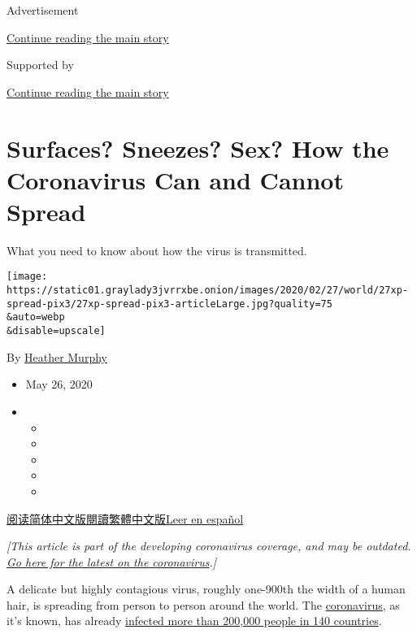 Advertisement

\protect\hyperlink{after-top}{Continue reading the main story}

Supported by

\protect\hyperlink{after-sponsor}{Continue reading the main story}

\hypertarget{surfaces-sneezes-sex-how-the-coronavirus-can-and-cannot-spread}{%
\section{Surfaces? Sneezes? Sex? How the Coronavirus Can and Cannot
Spread}\label{surfaces-sneezes-sex-how-the-coronavirus-can-and-cannot-spread}}

What you need to know about how the virus is transmitted.

\texttt{[image: https://static01.graylady3jvrrxbe.onion/images/2020/02/27/world/27xp-spread-pix3/27xp-spread-pix3-articleLarge.jpg?quality=75\\\&auto=webp\\\&disable=upscale]}

By \href{https://www.nytimes3xbfgragh.onion/by/heather-murphy}{Heather
Murphy}

\begin{itemize}
\item
  May 26, 2020
\item
  \begin{itemize}
  \item
  \item
  \item
  \item
  \item
  \end{itemize}
\end{itemize}

\href{https://cn.nytimes3xbfgragh.onion/health/20200303/coronavirus-how-it-spreads/}{阅读简体中文版}\href{https://cn.nytimes3xbfgragh.onion/health/20200303/coronavirus-how-it-spreads/zh-hant/}{閱讀繁體中文版}\href{https://www.nytimes3xbfgragh.onion/es/2020/03/03/espanol/ciencia-y-tecnologia/coronavirus-como-se-transmite.html}{Leer
en español}

\emph{{[}This article is part of the developing coronavirus coverage,
and may be outdated.}
\href{https://www.nytimes3xbfgragh.onion/news-event/coronavirus}{\emph{Go
here for the latest on the coronavirus}}\emph{.{]}}

A delicate but highly contagious virus, roughly one-900th the width of a
human hair, is spreading from person to person around the world. The
\href{https://www.nytimes3xbfgragh.onion/2020/03/03/world/coronavirus-news.html}{coronavirus},
as it's known, has already
\href{https://www.nytimes3xbfgragh.onion/interactive/2020/world/coronavirus-maps.html}{infected
more than 200,000 people in 140 countries}.

